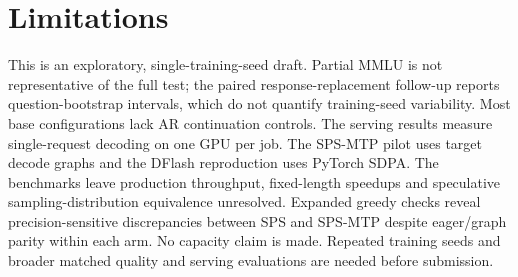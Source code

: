 \documentclass[11pt]{article}
\begin{document}
\section*{Limitations}
This is an exploratory, single-training-seed draft. Partial MMLU is not representative of the full test; the paired response-replacement follow-up reports question-bootstrap intervals, which do not quantify training-seed variability. Most base configurations lack AR continuation controls. The serving results measure single-request decoding on one GPU per job. The SPS-MTP pilot uses target decode graphs and the DFlash reproduction uses PyTorch SDPA. The benchmarks leave production throughput, fixed-length speedups and speculative sampling-distribution equivalence unresolved. Expanded greedy checks reveal precision-sensitive discrepancies between SPS and SPS-MTP despite eager/graph parity within each arm. No capacity claim is made. Repeated training seeds and broader matched quality and serving evaluations are needed before submission.


\clearpage
\appendix

\end{document}
